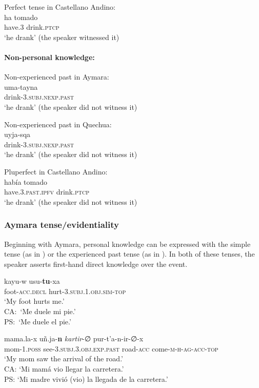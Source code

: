 \documentclass[output=paper,hidelinks]{langscibook}
\begin{document}
\ea \label{ex:exp.CA}
 {Perfect tense in Castellano Andino:} \\
\gll ha tomado \\
have.\textsc{3} drink.\textsc{ptcp} \\ 
\glt ‘he drank’ (the speaker witnessed it)
\z

\paragraph*{Non-personal knowledge:}

\ea \label{ex:nexp.Ay}
 {Non-experienced past in Aymara:} \\
\gll uma-tayna \\
drink-\textsc{3.subj.nexp.past}\\
\glt ‘he drank’ (the speaker did not witness it)
\z

\ea \label{ex:nexp.Qu}
 {Non-experienced past in Quechua:} \\
\gll uyja-sqa\\ 
drink-\textsc{3.subj.nexp.past}\\
\glt ‘he drank’ (the speaker did not witness it)
\z

\ea \label{ex:nexp.CA}
 {Pluperfect in Castellano Andino:} \\
\gll hab\'{i}a tomado\\ have\textsc{.3.past.ipfv} drink.\textsc{ptcp}\\
\glt ‘he drank’ (the speaker did not witness it)
\z



\subsubsection{Aymara tense/evidentiality}
 Beginning with Aymara, personal knowledge can be expressed with the simple tense (as in ) or the experienced past tense (as in ). In both of these tenses, the speaker asserts first-hand direct knowledge over the event.

\ea \label{ex:simple1}
\gll kayu-w usu-\textbf{tu}-xa \\
foot-\textsc{acc.decl} hurt-\textsc{3.subj.1.obj.sim-top} \\ 
\glt ‘My foot hurts me.’ \citep[411]{coler2014grammar} \\
CA:~`Me duele mi pie.'\\
PS:~`Me duele el pie.'
\z

\ea \label{ex:prox1}
\gll mama.la-x uñ.ja-\textbf{n} \textit{kartir}-∅ pur-t'a-n-ir-∅-x \\
mom-\textsc{1.poss} see-\textsc{3.subj.3.obj.exp.past} road-\textsc{acc} come-\textsc{m-h-ag-acc-top} \\ 
\glt ‘My mom saw the arrival of the road.’ \citep[413]{coler2014grammar} \\ 
CA: `Mi mamá vio llegar la carretera.'\\
PS: `Mi madre vivió (vio) la llegada de la carretera.'
\z
\end{document}
